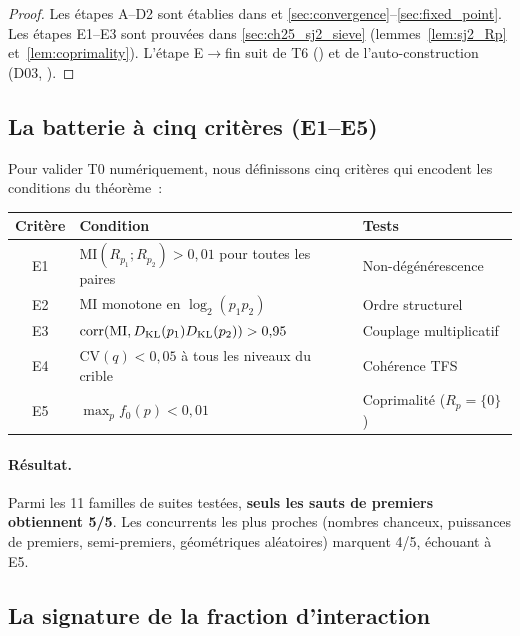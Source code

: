 \documentclass[12pt,a4paper]{article}
\begin{document}
\begin{proof}
Les étapes A--D2 sont établies dans
\cite{companion_M1,companion_M2} et
\cref{sec:convergence}--\cref{sec:fixed_point}.
Les étapes E1--E3 sont prouvées dans \cref{sec:ch25_sj2_sieve}
(lemmes~\ref{lem:sj2_Rp} et~\ref{lem:coprimality}).
L'étape E$\to$fin suit de T6 (\cite{companion_M1}) et de
l'auto-construction (D03, \cite{companion_M1}).
\end{proof}

\subsection{La batterie à cinq critères (E1--E5)}
\label{sec:ch25_E1E5}

Pour valider T0 numériquement, nous définissons cinq critères qui
encodent les conditions du théorème~:

\begin{center}
\begin{tabular}{cll}
\toprule
Critère & Condition & Tests \\
\midrule
E1 & $\mathrm{MI}(R_{p_1}; R_{p_2}) > 0{,}01$ pour toutes les paires & Non-dégénérescence \\
E2 & MI monotone en $\log_2(p_1 p_2)$ & Ordre structurel \\
E3 & $\mathrm{corr}(\mathrm{MI}, D_{\mathrm{KL}}(p_1)D_{\mathrm{KL}}(p_2)) > 0{,}95$ & Couplage multiplicatif \\
E4 & $\mathrm{CV}(q) < 0{,}05$ à tous les niveaux du crible & Cohérence TFS \\
E5 & $\max_p f_0(p) < 0{,}01$ & Coprimalité ($R_p = \{0\}$) \\
\bottomrule
\end{tabular}
\end{center}

\paragraph{Résultat.} Parmi les 11 familles de suites testées,
\textbf{seuls les sauts de premiers obtiennent 5/5}. Les
concurrents les plus proches (nombres chanceux, puissances de
premiers, semi-premiers, géométriques aléatoires) marquent 4/5,
échouant à E5.

\subsection{La signature de la fraction d'interaction}
\label{sec:ch25_fraction}
\end{document}

